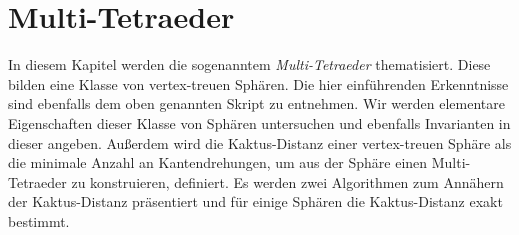 \documentclass[12pt,titlepage,twoside,cleardoublepage]{article}
\theoremstyle{nummermitklammern}
\numberwithin{equation}{section}
\begin{document}
\section{Multi-Tetraeder}\label{kapitelmultitetraeder}
In diesem Kapitel werden die sogenanntem \emph{Multi-Tetraeder} thematisiert. Diese bilden eine Klasse von vertex-treuen Sphären. Die hier einführenden Erkenntnisse sind ebenfalls dem oben genannten Skript zu entnehmen. Wir werden elementare Eigenschaften dieser Klasse von Sphären untersuchen und ebenfalls Invarianten in dieser angeben. Außerdem wird die Kaktus-Distanz einer vertex-treuen Sphäre als die minimale Anzahl an Kantendrehungen, um aus der Sphäre einen Multi-Tetraeder zu konstruieren, definiert. Es werden zwei Algorithmen zum Annähern der Kaktus-Distanz präsentiert und für einige Sphären die Kaktus-Distanz exakt bestimmt.
\end{document}
